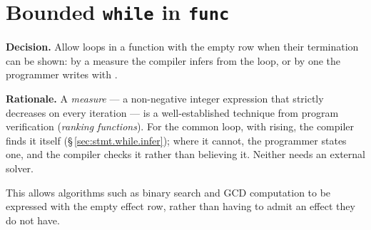 \section{Bounded \texttt{while} in \texttt{func}}
\label{sec:rationale.bounded-while}

\pnum
\textbf{Decision.}  Allow  loops in a function with the empty row when
their termination can be shown: by a measure the compiler infers from the loop, or by one
the programmer writes with .

\pnum
\textbf{Rationale.}
A \textit{measure} --- a non-negative integer expression that strictly decreases on every
iteration --- is a well-established technique from program verification
(\textit{ranking functions}).  For the common loop,  with 
rising, the compiler finds it itself (\S\,\ref{sec:stmt.while.infer}); where it cannot, the
programmer states one, and the compiler checks it rather than believing it.  Neither needs
an external solver.

\pnum
This allows algorithms such as binary search and GCD computation to be
expressed with the empty effect row, rather than having to admit an effect they do not have.
